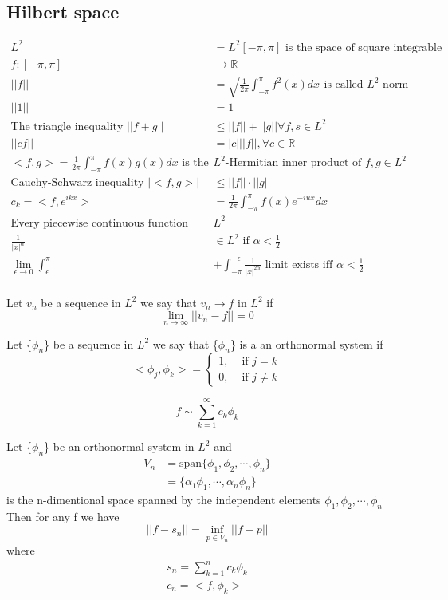 \subsection{Hilbert space}
\begin{align*}{}{}
L^2&=L^2[-\pi,\pi] \text{ is the space of square integrable functions}\\
f:[-\pi,\pi]&\rightarrow\mathbb{R} \\
||f||&=\sqrt{\frac{1}{2\pi}\int_{-\pi}^{\pi}f^2(x)dx} \text{ is called }L^2\text{ norm}\\
||1||&=1\\
\text{The triangle inequality }||f+g||&\leq||f||+||g|| \forall f,s \in L^2\\
||cf||&=|c|||f||,\forall c\in\mathbb{R}\\
<f,g>=\frac{1}{2\pi}\int_{-\pi}^{\pi}f(x)\bar{g(x)}dx \text{ is the }&L^2\text{-Hermitian inner product of } f,g\in L^2\\
\text{Cauchy-Schwarz inequality }|<f,g>|&\leq||f||\cdot||g||\\
c_k=<f,e^{ikx}>&=\frac{1}{2\pi}\int_{-\pi}^{\pi}f(x)e^{-iux}dx\\
\text{Every piecewise continuous function belongs to }&L^2\\
\frac{1}{|x|^{\alpha}}&\in L^2 \text{ if } \alpha<\frac{1}{2}\\
\lim_{\epsilon\rightarrow0}\int_{\epsilon}^{\pi}&+\int_{-\pi}^{-\epsilon}\frac{1}{|x|^{2\alpha}}\text{ limit exists iff } \alpha<\frac{1}{2}\\
\end{align*}
\begin{definition}[]{}
Let $ v_n $ be a sequence in $ L^2 $ we say that $ v_n\rightarrow f $ in $ L^2 $ if$$
    \lim_{n\rightarrow\infty}||v_n-f||=0
$$     
\end{definition}
\begin{definition}[]{}
Let \{$ \phi_n $\} be a sequence in $ L^2 $ we say that \{$ \phi_n $\} is a an orthonormal system if $$
    <\phi_j,\phi_k>=\begin{cases}
        1, & \text{ if } j=k\\
        0, & \text{ if } j\neq k
    \end{cases}
$$ 
\end{definition}
$$
    f\sim \sum_{k=1}^{\infty}c_k\phi_k
$$ 
\begin{theorem}[]{}
Let \{$ \phi_n $\}  be an orthonormal system in $ L^2 $ and \begin{align*}{}{}
V_n&=\text{span}\{\phi_1,\phi_2,\cdots,\phi_n\}\\
&=\{\alpha_1\phi_1,\cdots,\alpha_n\phi_n\}
\end{align*}
is the n-dimentional space spanned by the independent elements $ \phi_1,\phi_2,\cdots,\phi_n $\\
Then for any f we have $$
    ||f-s_n||=\inf_{p\in V_n}||f-p||
$$ where \begin{align*}{}{}
s_n=\sum_{k=1}^{n}c_k\phi_k\\
c_n=<f,\phi_k>
\end{align*}
\end{theorem}
